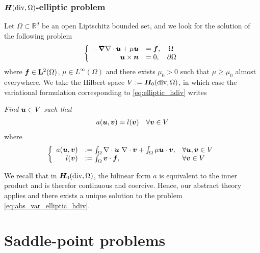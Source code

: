 \subsubsection*{$\bm{H}(\mbox{div}, \Omega)$-elliptic problem}
Let $\Omega \subset \mathbb{R}^d$ be an open Liptschitz bounded set, and we look for the solution of the following problem
\begin{align}
  \left\{ 
  \begin{array}{rl}
    - \boldsymbol{\nabla} \nabla \cdot \bm{u} + \mu \bm{u} &= \bm{f}, \quad \Omega 
    \\
    \bm{u} \times \bm{n} &= 0, \quad \partial\Omega
  \end{array} \right.
  \label{eq:elliptic_hdiv}
\end{align}
where $\bm{f} \in \mathbf{L}^2(\Omega)$,  $\mu \in L^\infty(\Omega)$ and there exists $\mu_0 > 0$ such that $\mu \geq \mu_0$ almost everywhere.
We take the Hilbert space $V := \bm{H}_0(\mbox{div}, \Omega)$, in which case the variational formulation corresponding to \eqref{eq:elliptic_hdiv} writes 
\begin{tcolorbox}
  {\em Find $\bm{u} \in V$ such that}
  \begin{align}
      a(\bm{u},\bm{v}) = l(\bm{v}) \quad \forall \bm{v} \in V 
    \label{eq:abs_var_elliptic_hdiv}
  \end{align}
  where 
  \begin{align}
    \left\{ 
    \begin{array}{rll}
    a(\bm{u}, \bm{v}) &:= \int_{\Omega} \nabla \cdot \bm{u} ~ \nabla \cdot \bm{v} + \int_{\Omega} \mu \bm{u} \cdot \bm{v}, & \forall \bm{u}, \bm{v} \in V  \\
    l(\bm{v}) &:= \int_{\Omega} \bm{v} \cdot \bm{f}, & \forall \bm{v} \in V  
    \end{array} \right.
  \end{align}
\end{tcolorbox}
We recall that in $\bm{H}_0(\mbox{div}, \Omega)$, the bilinear form $a$ is equivalent to the inner product and is therefor continuous and coercive. Hence, our abstract theory applies and there exists a unique solution to the problem \eqref{eq:abs_var_elliptic_hdiv}.

\newpage
\section{Saddle-point problems}

